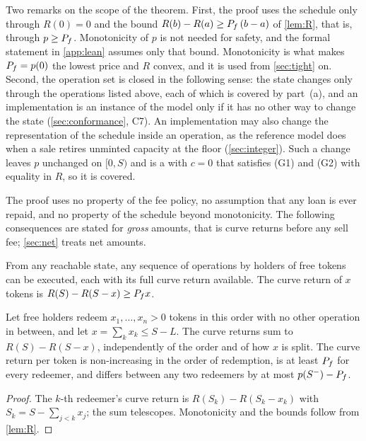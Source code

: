 Two remarks on the scope of the theorem. First, the proof uses the schedule only through $R(0)=0$ and the bound $R(b)-R(a)\ge P_f\,(b-a)$ of \cref{lem:R}, that is, through $p\ge P_f$. Monotonicity of $p$ is not needed for safety, and the formal statement in \cref{app:lean} assumes only that bound. Monotonicity is what makes $P_f=p(0)$ the lowest price and $R$ convex, and it is used from \cref{sec:tight} on. Second, the operation set is closed in the following sense: the state changes only through the operations listed above, each of which is covered by part~(a), and an implementation is an instance of the model only if it has no other way to change the state (\cref{sec:conformance}, C7). An implementation may also change the representation of the schedule inside an operation, as the reference model does when a sale retires unminted capacity at the floor (\cref{sec:integer}). Such a change leaves $p$ unchanged on $[0,S)$ and is a  with $c=0$ that satisfies (G1) and (G2) with equality in $R$, so it is covered.

The proof uses no property of the fee policy, no assumption that any loan is ever repaid, and no property of the schedule beyond monotonicity. The following consequences are stated for \emph{gross} amounts, that is curve returns before any sell fee; \cref{sec:net} treats net amounts.

\begin{corollary}\label{cor:redeem}
From any reachable state, any sequence of  operations by holders of free tokens can be executed, each with its full curve return available. The curve return of $x$ tokens is $R(S)-R(S-x)\ge P_f x$.
\end{corollary}

\begin{corollary}\label{cor:run}
Let free holders redeem $x_1,\dots,x_n>0$ tokens in this order with no other operation in between, and let $x=\sum_k x_k\le S-L$. The curve returns sum to $R(S)-R(S-x)$, independently of the order and of how $x$ is split. The curve return per token is non-increasing in the order of redemption, is at least $P_f$ for every redeemer, and differs between any two redeemers by at most $p(S^-)-P_f$.
\end{corollary}
\begin{proof}
The $k$-th redeemer's curve return is $R(S_k)-R(S_k-x_k)$ with $S_k=S-\sum_{j<k}x_j$; the sum telescopes. Monotonicity and the bounds follow from \cref{lem:R}.
\end{proof}


